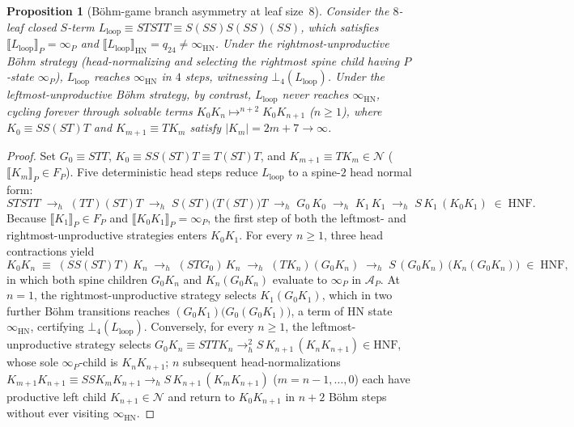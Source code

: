 \documentclass[11pt,reqno]{amsart}
\numberwithin{equation}{section}
\theoremstyle{plain}
\newtheorem{proposition}[theorem]{Proposition}
\theoremstyle{definition}
\theoremstyle{remark}
\newcommand{\HNF}{\mathrm{HNF}}
\newcommand{\HN}{\mathrm{HN}}
\newcommand{\sem}[1]{\llbracket #1 \rrbracket}
\begin{document}
\begin{proposition}[B\"ohm-game branch asymmetry at leaf size~$8$]\label{prop:bohm-game-asymmetry}
Consider the $8$-leaf closed $S$-term $L_{\mathrm{loop}} \equiv S T S T T \equiv S(S S)S(S S)(S S)$, which satisfies $\sem{L_{\mathrm{loop}}}_P = \infty_P$ and $\sem{L_{\mathrm{loop}}}_{\HN} = q_{24} \neq \infty_{\HN}$. Under the rightmost-unproductive B\"ohm strategy (head-normalizing and selecting the rightmost spine child having $P$-state $\infty_P$), $L_{\mathrm{loop}}$ reaches $\infty_{\HN}$ in $4$ steps, witnessing $\bot_4(L_{\mathrm{loop}})$. Under the leftmost-unproductive B\"ohm strategy, by contrast, $L_{\mathrm{loop}}$ never reaches $\infty_{\HN}$, cycling forever through solvable terms $K_0 K_n \mapsto^{n+2} K_0 K_{n+1}$ ($n \ge 1$), where $K_0 \equiv S S (S T)T$ and $K_{m+1} \equiv T K_m$ satisfy $|K_m| = 2m + 7 \to \infty$.
\end{proposition}

\begin{proof}
Set $G_0 \equiv S T T$, $K_0 \equiv S S (S T) T \equiv T(S T)T$, and $K_{m+1} \equiv T K_m \in \mathcal{N}$ ($\sem{K_m}_P \in F_P$). Five deterministic head steps reduce $L_{\mathrm{loop}}$ to a spine-$2$ head normal form:
\[
S T S T T
\;\longrightarrow_h\; (T T)(S T)T
\;\longrightarrow_h\; S(S T)\bigl(T(S T)\bigr)T
\;\longrightarrow_h\; G_0\,K_0
\;\longrightarrow_h\; K_1\,K_1
\;\longrightarrow_h\; S\,K_1\,(K_0 K_1) \;\in\; \HNF.
\]
Because $\sem{K_1}_P \in F_P$ and $\sem{K_0 K_1}_P = \infty_P$, the first step of both the leftmost- and rightmost-unproductive strategies enters $K_0 K_1$. For every $n \ge 1$, three head contractions yield
\[
K_0 K_n \;\equiv\; (S S (S T) T)\,K_n
\;\longrightarrow_h\; (S T G_0)\,K_n
\;\longrightarrow_h\; (T K_n)(G_0 K_n)
\;\longrightarrow_h\; S\,(G_0 K_n)\,\bigl(K_n(G_0 K_n)\bigr) \;\in\; \HNF,
\]
in which both spine children $G_0 K_n$ and $K_n(G_0 K_n)$ evaluate to $\infty_P$ in $\mathcal{A}_P$. At $n = 1$, the rightmost-unproductive strategy selects $K_1(G_0 K_1)$, which in two further B\"ohm transitions reaches $(G_0 K_1)\bigl(G_0(G_0 K_1)\bigr)$, a term of $\HN$ state $\infty_{\HN}$, certifying $\bot_4(L_{\mathrm{loop}})$. Conversely, for every $n \ge 1$, the leftmost-unproductive strategy selects $G_0 K_n \equiv S T T K_n \to_h^2 S\,K_{n+1}\,(K_n K_{n+1}) \in \HNF$, whose sole $\infty_P$-child is $K_n K_{n+1}$; $n$ subsequent head-normalizations $K_{m+1} K_{n+1} \equiv S S K_m K_{n+1} \to_h S\,K_{n+1}\,(K_m K_{n+1})$ ($m = n - 1, \dots, 0$) each have productive left child $K_{n+1} \in \mathcal{N}$ and return to $K_0 K_{n+1}$ in $n + 2$ B\"ohm steps without ever visiting $\infty_{\HN}$.
\end{proof}
\end{document}
